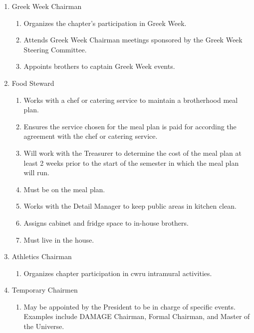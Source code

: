 \begin{enumerate}
				\item Greek Week Chairman
					\begin{enumerate}
						\item Organizes the chapter's participation in Greek Week.
						\item Attends Greek Week Chairman meetings sponsored by the Greek Week Steering Committee.
						\item Appoints brothers to captain Greek Week events.
					\end{enumerate}


				\item Food Steward
					\begin{enumerate}
						\item Works with a chef or catering service to maintain a brotherhood meal plan.
						\item Ensures the service chosen for the meal plan is paid for according the agreement with the chef or catering service.
						\item Will work with the Treasurer to determine the cost of the meal plan at least 2 weeks prior to the start of the semester in which the meal plan will run.
						\item Must be on the meal plan.
						\item Works with the Detail Manager to keep public areas in kitchen clean.
						\item Assigns cabinet and fridge space to in-house brothers.
						\item Must live in the house.
					\end{enumerate}

                \item Athletics Chairman
					\begin{enumerate}
						\item Organizes chapter participation in \gls{cwru} intramural activities.
					\end{enumerate}

				\item Temporary Chairmen
					\begin{enumerate}
						\item May be appointed by the President to be in charge of specific events. Examples include DAMAGE Chairman, Formal Chairman, and Master of the Universe.
					\end{enumerate}

	\end{enumerate}

